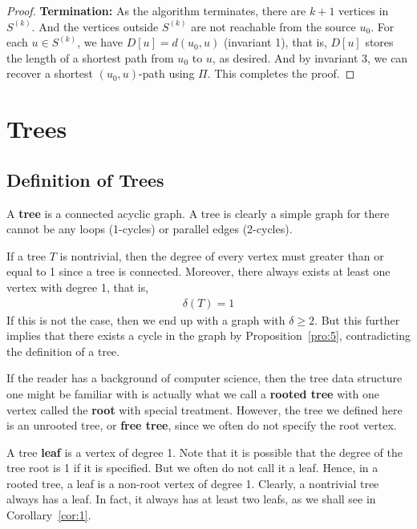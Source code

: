 \documentclass[thmcnt=section, 12pt, color=cyan]{my-elegantbook}
\begin{document}
\begin{proof}
    \noindent\textbf{Termination:} As the algorithm terminates, there are $k+1$ vertices in $S^{(k)}$. And the vertices outside $S^{(k)}$ are not reachable from the source $u_0$. For each $u \in S^{(k)}$, we have $D[u] = d(u_0, u)$ (invariant 1), that is, $D[u]$ stores the length of a shortest path from $u_0$ to $u$, as desired. And by invariant 3, we can recover a shortest $(u_0, u)$-path using $\Pi$. This completes the proof.
\end{proof}


\chapter{Trees} \label{chap:1}


\section{Definition of Trees}

A \textbf{tree} is a connected acyclic graph.
A tree is clearly a simple graph for there cannot be any loops (1-cycles)
or parallel edges (2-cycles).

If a tree $T$ is nontrivial, then the degree of every vertex
must greater than or equal to 1 since a tree is connected.
Moreover, there always exists at least one vertex with degree 1,
that is,
\begin{align*}
    \delta(T) = 1
\end{align*}
If this is not the case, then we end up with a graph with 
$\delta \geq 2$. 
But this further implies that there exists a cycle
in the graph by Proposition~\ref{pro:5}, 
contradicting the definition of a tree.

If the reader has a background of computer science,
then the tree data structure one might be familiar with
is actually what we call a \textbf{rooted tree}
with one vertex called the \textbf{root} 
with special treatment.
However, the tree we defined here is an unrooted tree, 
or \textbf{free tree},
since we often do not specify the root vertex.

A tree \textbf{leaf} is a vertex of degree 1. 
Note that it is possible that the degree of the tree root is 1
if it is specified.
But we often do not call it a leaf.
Hence, in a rooted tree, a leaf is a non-root vertex of degree 1.
Clearly, a nontrivial tree always has a leaf.
In fact, it always has at least two leafs,
as we shall see in Corollary~\ref{cor:1}.
\end{document}
